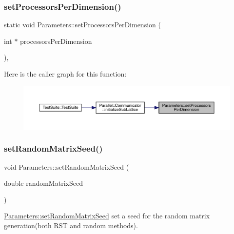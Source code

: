 \subsubsection{\texorpdfstring{setProcessorsPerDimension()}{setProcessorsPerDimension()}}
{\footnotesize\ttfamily static void Parameters\+::set\+Processors\+Per\+Dimension (\begin{DoxyParamCaption}\item[{int $\ast$}]{processors\+Per\+Dimension }\end{DoxyParamCaption})\hspace{0.3cm}{\ttfamily [inline]}, {\ttfamily [static]}}

Here is the caller graph for this function\+:\nopagebreak
\begin{figure}[H]
\begin{center}
\leavevmode
\includegraphics[width=350pt]{class_parameters_a4c983b1ab17ec51be118792b3a6d17a5_icgraph}
\end{center}
\end{figure}
\mbox{\label{class_parameters_a46615f8286bd7363ab1f09074fdc6940}} 
\subsubsection{\texorpdfstring{setRandomMatrixSeed()}{setRandomMatrixSeed()}}
{\footnotesize\ttfamily void Parameters\+::set\+Random\+Matrix\+Seed (\begin{DoxyParamCaption}\item[{double}]{random\+Matrix\+Seed }\end{DoxyParamCaption})\hspace{0.3cm}{\ttfamily [static]}}



\mbox{\hyperlink{class_parameters_a46615f8286bd7363ab1f09074fdc6940}{Parameters\+::set\+Random\+Matrix\+Seed}} set a seed for the random matrix generation(both R\+S\+T and random methods). 


